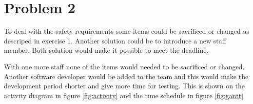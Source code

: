 \chapter{Problem 2}
\label{chp:two}


To deal with the safety requirements some items could be sacrificed or changed as descriped in exercise 1. Another solution could be to introduce a new staff member. Both solution would make it possible to meet the deadline.

With one more staff none of the items would needed to be sacrificed or changed. Another software developer would be added to the team and this would make the development period shorter and give more time for testing. This is shown on the activity diagram in figure \ref{fig:activity} and the time schedule in figure \ref{fig:gantt}





